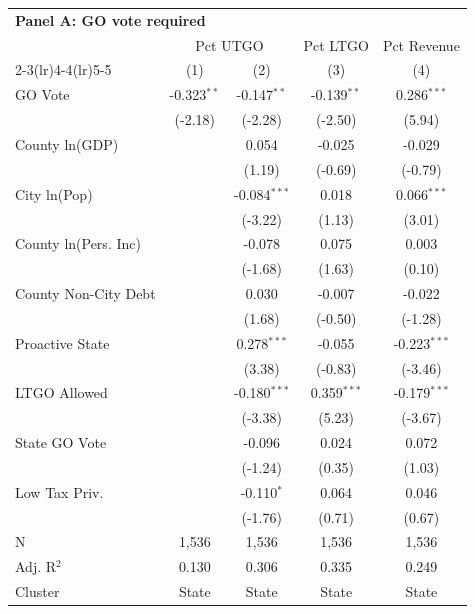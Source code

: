 \begingroup
\centering
\begin{tabular*}{\textwidth}{@{\extracolsep{\fill}}lcccc}
\multicolumn{5}{l}{\textbf{Panel A: GO vote required}}\\

\addlinespace
   \toprule
    & \multicolumn{2}{c}{Pct UTGO} & Pct LTGO & Pct Revenue\\
   \cmidrule(lr){2-3}\cmidrule(lr){4-4}\cmidrule(lr){5-5}
                        & (1)           & (2)            & (3)           & (4)\\  
   \midrule 
   GO Vote              & -0.323$^{**}$ & -0.147$^{**}$  & -0.139$^{**}$ & 0.286$^{***}$\\   
                        & (-2.18)      & (-2.28)       & (-2.50)      & (5.94)\\   
   County ln(GDP)       &               & 0.054          & -0.025        & -0.029\\   
                        &               & (1.19)        & (-0.69)      & (-0.79)\\   
   City ln(Pop)         &               & -0.084$^{***}$ & 0.018         & 0.066$^{***}$\\   
                        &               & (-3.22)       & (1.13)       & (3.01)\\   
   County ln(Pers. Inc) &               & -0.078         & 0.075         & 0.003\\   
                        &               & (-1.68)       & (1.63)       & (0.10)\\   
   County Non-City Debt &               & 0.030          & -0.007        & -0.022\\   
                        &               & (1.68)        & (-0.50)      & (-1.28)\\   
   Proactive State      &               & 0.278$^{***}$  & -0.055        & -0.223$^{***}$\\   
                        &               & (3.38)        & (-0.83)      & (-3.46)\\   
   LTGO Allowed         &               & -0.180$^{***}$ & 0.359$^{***}$ & -0.179$^{***}$\\   
                        &               & (-3.38)       & (5.23)       & (-3.67)\\   
   State GO Vote        &               & -0.096         & 0.024         & 0.072\\   
                        &               & (-1.24)       & (0.35)       & (1.03)\\   
   Low Tax Priv.        &               & -0.110$^{*}$   & 0.064         & 0.046\\   
                        &               & (-1.76)       & (0.71)       & (0.67)\\   
   \hline
   N         & 1,536         & 1,536          & 1,536         & 1,536\\  
   Adj. R$^2$       & 0.130         & 0.306          & 0.335         & 0.249\\  
   Cluster              & State & State & State & State\\  
   \bottomrule
\end{tabular*}
\par\endgroup
